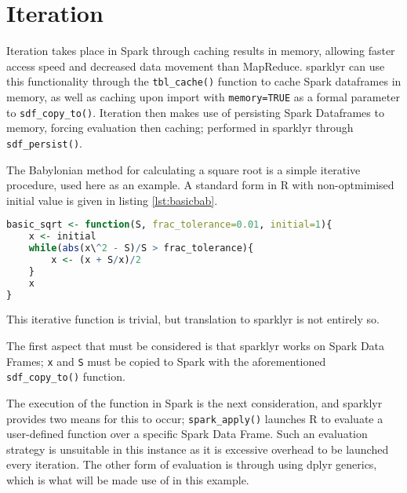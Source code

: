 \documentclass[10pt,a4paper]{article}
\begin{document}
\section{Iteration}

Iteration takes place in Spark through caching results in memory, allowing
faster access speed and decreased data movement than MapReduce.
sparklyr can use this functionality through the \texttt{tbl\_cache()} function
to cache Spark dataframes in memory, as well as caching upon import with
\texttt{memory=TRUE} as a formal parameter to \texttt{sdf\_copy\_to()}. 
Iteration then makes use of persisting Spark Dataframes to memory, forcing
evaluation then caching; performed in sparklyr through \texttt{sdf\_persist()}.

The Babylonian method for calculating a square root is a simple iterative
procedure, used here as an example.
A standard form in R with non-optmimised initial value is given in listing
\ref{lst:basicbab}.

\begin{lstlisting}[language=R, caption={Simple Iteration with the Babylonian Method}, label=lst:basicbab]
basic_sqrt <- function(S, frac_tolerance=0.01, initial=1){
	x <- initial
	while(abs(x\^2 - S)/S > frac_tolerance){
		x <- (x + S/x)/2
	}
	x
}
\end{lstlisting}

This iterative function is trivial, but translation to sparklyr is not entirely so.

The first aspect that must be considered is that sparklyr works on Spark Data
Frames;
\texttt{x} and \texttt{S} must be copied to Spark with the aforementioned
\texttt{sdf\_copy\_to()} function.

The execution of the function in Spark is the next consideration, and sparklyr
provides two means for this to occur;
\texttt{spark\_apply()} launches R to evaluate a user-defined function over a
specific Spark Data Frame. 
Such an evaluation strategy is unsuitable in this instance as it is excessive
overhead to be launched every iteration. 
The other form of evaluation is through using dplyr generics, which is what
will be made use of in this example.
\end{document}
